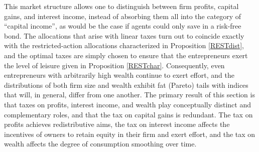 \documentclass[11pt]{article}
\theoremstyle{plain}
\begin{document}
This market structure allows one to distinguish between firm profits, capital gains, and interest income, instead of absorbing them all into the category of ``capital income'', as would be the case if agents could only save in a risk-free bond. The allocations that arise with linear taxes turn out to coincide exactly with the restricted-action allocations characterized in Proposition \ref{RESTdist}, and the optimal taxes are simply chosen to ensure that the entrepreneurs exert the level of leisure given in Proposition \ref{RESTchar}. Consequently, even entrepreneurs with arbitrarily high wealth continue to exert effort, and the distributions of both firm size and wealth exhibit fat (Pareto) tails with indices that will, in general, differ from one another. The primary result of this section is that taxes on profits, interest income, and wealth play conceptually distinct and complementary roles, and that the tax on capital gains is redundant. The tax on profits achieves redistributive aims, the tax on interest income affects the incentives of owners to retain equity in their firm and exert effort, and the tax on wealth affects the degree of consumption smoothing over time.

\end{document}
